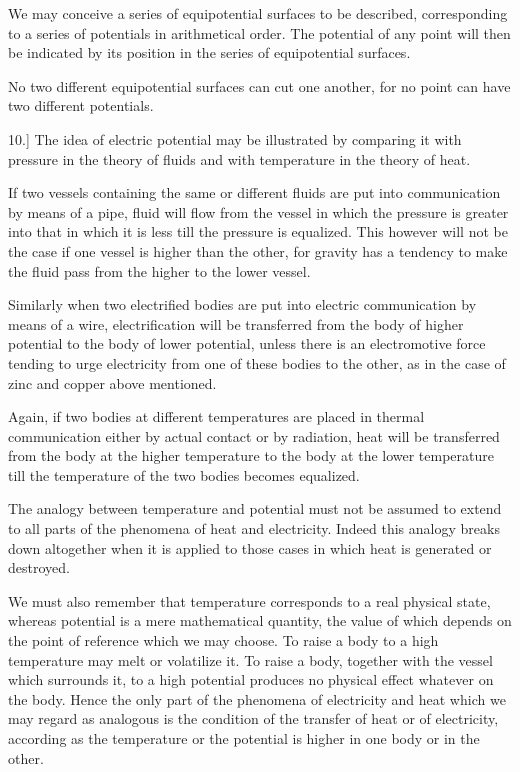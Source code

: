 \documentclass[12pt,oneside]{book}[2021/10/04]
\newcommand{\Runhead}[1]{\fancyhead[C]{\iffloatpage{}{\small#1}}}
\newcommand{\article}[1]{\phantomsection \label{art:#1}{#1.]}}
\newcommand{\¬}{\hphantom{0}}
\begin{document}
We may conceive a series of equipotential surfaces to be described,
corresponding to a series of potentials in arithmetical order.
The potential of any point will then be indicated by its position in
the series of equipotential surfaces.

No two different equipotential surfaces can cut one another, for
no point can have two different potentials.
\Runhead{EQUIPOTENTIAL SURFACES.}

\article{10} The idea of electric potential may be illustrated by comparing
it with pressure in the theory of fluids and with temperature
in the theory of heat.

If two vessels containing the same or different fluids are put into
communication by means of a pipe, fluid will flow from the vessel
in which the pressure is greater into that in which it is less till the
pressure is equalized. This however will not be the case if one
vessel is higher than the other, for gravity has a tendency to make
the fluid pass from the higher to the lower vessel.

Similarly when two electrified bodies are put into electric communication
by means of a wire, electrification will be transferred
from the body of higher potential to the body of lower potential,
unless there is an electromotive force tending to urge electricity
from one of these bodies to the other, as in the case of zinc and
copper above mentioned.

Again, if two bodies at different temperatures are placed in
thermal communication either by actual contact or by radiation,
heat will be transferred from the body at the higher temperature
to the body at the lower temperature till the temperature of the
two bodies becomes equalized.

The analogy between temperature and potential must not be
assumed to extend to all parts of the phenomena of heat and
electricity. Indeed this analogy breaks down altogether when it is
applied to those cases in which heat is generated or destroyed.

We must also remember that temperature corresponds to a real
physical state, whereas potential is a mere mathematical quantity,
the value of which depends on the point of reference which we may
choose. To raise a body to a high temperature may melt or
volatilize it. To raise a body, together with the vessel which surrounds
it, to a high potential produces no physical effect whatever
on the body. Hence the only part of the phenomena of electricity
and heat which we may regard as analogous is the condition of the
transfer of heat or of electricity, according as the temperature or
the potential is higher in one body or in the other.
\end{document}
